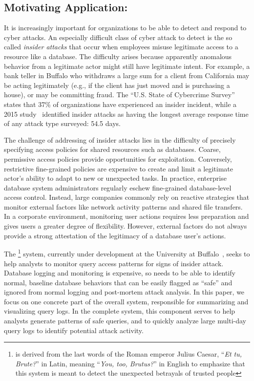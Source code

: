 \subsection{Motivating Application: \sysname{}}
\label{sec:motivation}
It is increasingly important for organizations to be able to detect and respond to cyber attacks.
An especially difficult class of cyber attack to detect is the so called \textit{insider attacks} that occur when employees misuse legitimate access to a resource like a database.
The difficulty arises because apparently anomalous behavior from a legitimate actor might still have legitimate intent.  
For example, a bank teller in Buffalo who withdraws a large sum for a client from California may be acting legitimately (e.g., if the client has just moved and is purchasing a house), or may be committing fraud.
The ``U.S. State of Cybercrime Survey''~\cite{cybercrimeReport2014} states that 37\% of organizations have experienced an insider incident, while a 2015 study~\cite{ponemonReport2015} identified insider attacks as having the longest average response time of any attack type surveyed: 54.5 days.

The challenge of addressing of insider attacks lies in the difficulty of precisely specifying access policies for shared resources such as databases. 
Coarse, permissive access policies provide opportunities for exploitation. 
Conversely, restrictive fine-grained policies are expensive to create and limit a legitimate actor's ability to adapt to new or unexpected tasks.
In practice, enterprise database system administrators regularly eschew fine-grained database-level access control.  
Instead, large companies commonly rely on reactive strategies that monitor external factors like network activity patterns and shared file transfers.
In a corporate environment, monitoring user actions requires less preparation and gives users a greater degree of flexibility. 
However, external factors do not always provide a strong attestation of the legitimacy of a database user's actions. 

The \sysname{}\footnote{\sysname{} is derived from the last words of the Roman emperor Julius Caesar, ``\textit{Et tu, Brute?}'' in Latin, meaning ``\textit{You, too, Brutus?}'' in English to emphasize that this system is meant to detect the unexpected betrayals of trusted people} system, currently under development at the University at Buffalo~\cite{kul2016ettu}, seeks to help analysts to monitor query access patterns for signs of insider attack.  Database logging and monitoring is expensive, so \sysname{} needs to be able to identify normal, baseline database behaviors that can be easily flagged as ``safe'' and ignored from normal logging and post-mortem attack analysis.  In this paper, we focus on one concrete part of the overall \sysname{} system, responsible for summarizing and visualizing query logs.  In the complete system, this component serves to help analysts generate patterns of safe queries, and to quickly analyze large multi-day query logs to identify potential attack activity.
